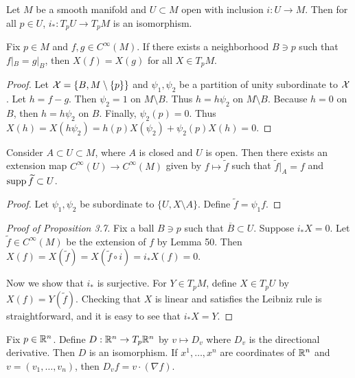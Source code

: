 \documentclass[twoside, 10pt]{article}
\begin{document}
    \begin{prop}[``Localization''] Let $M$ be a smooth manifold and $U \subset
    M$ open with inclusion $i:U \to M$. Then for all $p \in U$, $i_*:T_pU \to
T_pM$ is an isomorphism.  \end{prop}
    
    \begin{lem} Fix $p \in M$ and $f,g \in C^{\infty}(M)$. If there exists a
    neighborhood $B \ni p$ such that $f|_B = g|_B$, then $X(f) = X(g)$ for all
$X \in T_pM$.  \end{lem}

    \begin{proof} Let $\mathcal{X} = \{B, M \setminus \{p\}\}$ and $\psi_1, \psi_2$
        be a partition of unity subordinate to $\mathcal{X}$. Let $h = f-g$. Then
        $\psi_2 = 1$ on $M \setminus B$. Thus $h=h\psi_2$ on $M \setminus B$.
        Because $h=0$ on $B$, then $h = h \psi_2$ on $B$. Finally, $\psi_2(p) =
        0$. Thus $X(h) = X(h \psi_2) = h(p)X(\psi_2)+\psi_2(p)X(h) = 0$.
    \end{proof}

    \begin{lem} Consider $A \subset U \subset M$, where $A$ is closed and $U$
        is open. Then there exists an extension map $C^{\infty}(U) \to
        C^{\infty}(M)$ given by $f \mapsto \widetilde{f}$ such that
        $\widetilde{f}|_A = f$ and $\operatorname{supp} \widetilde{f} \subset U$.  \end{lem}

    \begin{proof} Let $\psi_1, \psi_2$ be subordinate to $\{U, X \setminus
    A\}$. Define $\widetilde{f} = \psi_1 f$.  \end{proof}

    \begin{proof}[Proof of Proposition 3.7] Fix a ball $B \ni p$ such that
        $\overline{B} \subset U$. Suppose $i_*X = 0$. Let $\widetilde{f} \in
        C^{\infty}(M)$ be the extension of $f$ by Lemma 50. Then
        $X(f)=X(\widetilde{f}) = X(\widetilde{f} \circ i) = i_*X(f) = 0$.

        Now we show that $i_*$ is surjective. For $Y \in T_pM$, define $X \in
    T_pU$ by $X(f) = Y(\widetilde{f})$. Checking that $X$ is linear and
satisfies the Leibniz rule is straightforward, and it is easy to see that $i_*X
= Y$.  \end{proof}

    \begin{prop} Fix $p \in \mathbb{R}^n$. Define $D: \mathbb{R}^n \to T_p \mathbb{R}^n$ by $v \mapsto
        D_v$ where $D_v$ is the directional derivative. Then $D$ is an
        isomorphism. If $x^1, \ldots, x^n$ are coordinates of $\mathbb{R}^n$ and $v =
        (v_1, \ldots, v_n)$, then $D_v f = v \cdot ( \nabla f )$.  \end{prop}
\end{document}
